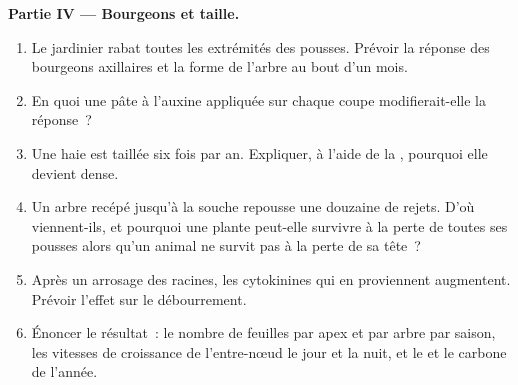 \begin{problem}
\medskip
\noindent\textbf{Partie IV --- Bourgeons et taille.}
\begin{enumerate}[resume]
  \item Le jardinier rabat toutes les extrémités des pousses. Prévoir la
        réponse des bourgeons axillaires et la forme de l'arbre au bout
        d'un mois.
  \item En quoi une pâte à l'auxine appliquée sur chaque coupe
        modifierait-elle la réponse~?
  \item Une haie est taillée six fois par an. Expliquer, à l'aide de la
        , pourquoi elle devient dense.
  \item Un arbre recépé jusqu'à la souche repousse une douzaine de
        rejets. D'où viennent-ils, et pourquoi une plante peut-elle
        survivre à la perte de toutes ses pousses alors qu'un animal ne
        survit pas à la perte de sa tête~?
  \item Après un arrosage des racines, les cytokinines qui en proviennent
        augmentent. Prévoir l'effet sur le débourrement.
  \item Énoncer le résultat~: le nombre de feuilles par apex et par arbre
        par saison, les vitesses de croissance de l'entre-nœud le jour et
        la nuit, et le  et le carbone de l'année.
\end{enumerate}
\end{problem}
